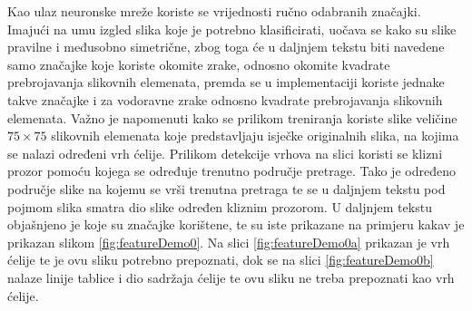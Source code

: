 \documentclass[times, utf8, zavrsni, numeric]{fer}
\begin{document}
Kao ulaz neuronske mreže koriste se vrijednosti ručno odabranih značajki.
Imajući na umu izgled slika koje je potrebno klasificirati, uočava se kako su slike pravilne i međusobno simetrične, zbog toga će u daljnjem tekstu biti navedene samo značajke koje koriste okomite zrake, odnosno okomite kvadrate prebrojavanja slikovnih elemenata, premda se u implementaciji koriste jednake takve značajke i za vodoravne zrake odnosno kvadrate prebrojavanja slikovnih elemenata.
Važno je napomenuti kako se prilikom treniranja koriste slike veličine $75\times 75$ slikovnih elemenata koje predstavljaju isječke originalnih slika, na kojima se nalazi određeni vrh ćelije.
Prilikom detekcije vrhova na slici koristi se klizni prozor pomoću kojega se određuje trenutno područje pretrage.
Tako je određeno područje slike na kojemu se vrši trenutna pretraga te se u daljnjem tekstu pod pojmom slika smatra dio slike određen kliznim prozorom.
U daljnjem tekstu objašnjeno je koje su značajke korištene, te su iste prikazane na primjeru kakav je prikazan slikom \ref{fig:featureDemo0}.
Na slici \ref{fig:featureDemo0a} prikazan je vrh ćelije te je ovu sliku potrebno prepoznati, dok se na slici \ref{fig:featureDemo0b} nalaze linije tablice i dio sadržaja ćelije te ovu sliku ne treba prepoznati kao vrh ćelije.\
\end{document}

